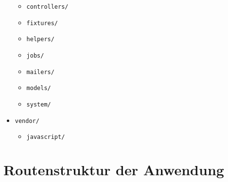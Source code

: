 \begin{itemize}
\begin{itemize}
        \item \texttt{controllers/}
        \item \texttt{fixtures/}
        \item \texttt{helpers/}
        \item \texttt{jobs/}
        \item \texttt{mailers/}
        \item \texttt{models/}
        \item \texttt{system/}
    \end{itemize}
    \item \texttt{vendor/}
    \begin{itemize}
        \item \texttt{javascript/}
    \end{itemize}
\end{itemize}

\newpage

\section{Routenstruktur der Anwendung}
\label{Routenstruktur_der_Anwendung}

